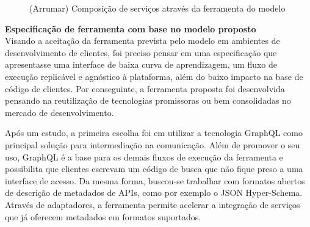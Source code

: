 \begin{figure}[H]
  \centering
  \caption{(Arrumar) Composição de serviços através da ferramenta do modelo}
\end{figure}

\textbf{Especificação de ferramenta com base no modelo proposto} \\

Visando a aceitação da ferramenta prevista pelo modelo em ambientes de desenvolvimento de clientes, foi preciso pensar em uma especificação que apresentasse uma interface de baixa curva de aprendizagem, um fluxo de execução replicável e agnóstico à plataforma, além do baixo impacto na base de código de clientes. Por conseguinte, a ferramenta proposta foi desenvolvida pensando na reutilização de tecnologias promissoras ou bem consolidadas no mercado de desenvolvimento.

Após um estudo, a primeira escolha foi em utilizar a tecnologia GraphQL como principal solução para intermediação na comunicação. Além de promover o seu uso, GraphQL é a base para os demais fluxos de execução da ferramenta e possibilita que clientes escrevam um código de busca que não fique preso a uma interface de acesso. Da mesma forma, buscou-se trabalhar com formatos abertos de descrição de metadados de APIs, como por exemplo o JSON Hyper-Schema. Através de adaptadores, a ferramenta permite acelerar a integração de serviços que já oferecem metadados em formatos suportados.

